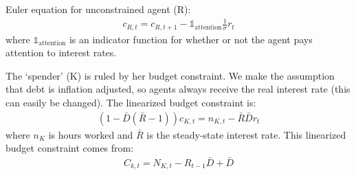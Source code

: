 \documentclass[AER]{AEA}
\begin{document}
Euler equation for unconstrained agent (R):
\begin{align}
	c_{R,t} = c_{R,t+1} - \mathds{1}_{\text{attention}} \frac{1}{\sigma}r_t
\end{align}
where $\mathds{1}_{\text{attention}}$ is an indicator function for whether or not the agent pays attention to interest rates.

The `spender' (K) is ruled by her budget constraint. We make the assumption that debt is inflation adjusted, so agents always receive the real interest rate (this can easily be changed). The linearized budget constraint is:
\begin{align}
	(1-\bar{D}(\bar{R}-1))c_{K,t} = n_{K,t} - \bar{R} \bar{D} r_t \label{spender_budget}
\end{align}
where $n_K$ is hours worked and $\bar{R}$ is the steady-state interest rate. This linearized budget constraint comes from:
\begin{align*}
	C_{k,t} = N_{K,t} - R_{t-1} \bar{D} + \bar{D}
\end{align*}
\end{document}
